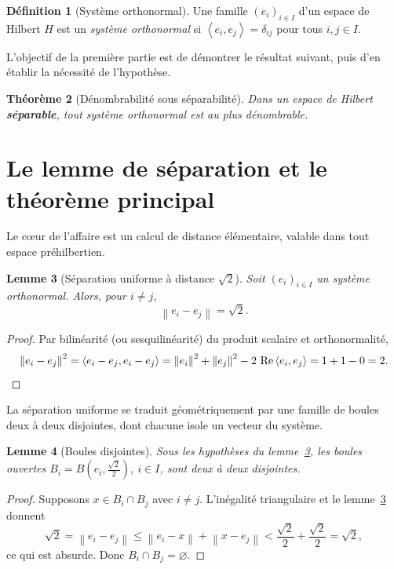 \documentclass[11pt,a4paper]{article}
\theoremstyle{plain}
\newtheorem{theoreme}{Théorème}[section]
\newtheorem{lemme}[theoreme]{Lemme}
\theoremstyle{definition}
\newtheorem{definition}[theoreme]{Définition}
\newcommand{\HH}{H}
\newcommand{\norm}[1]{\left\lVert #1 \right\rVert}
\newcommand{\scal}[2]{\left\langle #1 , #2 \right\rangle}
\renewcommand{\Re}{\operatorname{Re}}
\begin{document}
\begin{definition}[Système orthonormal]
Une famille $(e_i)_{i\in I}$ d'un espace de Hilbert $\HH$ est un \emph{système
orthonormal} si $\scal{e_i}{e_j} = \delta_{ij}$ pour tous $i,j \in I$.
\end{definition}

L'objectif de la première partie est de démontrer le résultat suivant, puis d'en
établir la nécessité de l'hypothèse.

\begin{theoreme}[Dénombrabilité sous séparabilité]\label{th:principal}
Dans un espace de Hilbert \textbf{séparable}, tout système orthonormal est
au plus dénombrable.
\end{theoreme}

\section{Le lemme de séparation et le théorème principal}

Le cœur de l'affaire est un calcul de distance élémentaire, valable dans tout
espace préhilbertien.

\begin{lemme}[Séparation uniforme à distance $\sqrt2$]\label{lem:sep}
Soit $(e_i)_{i\in I}$ un système orthonormal. Alors, pour $i \neq j$,
\[
  \norm{e_i - e_j} = \sqrt{2}.
\]
\end{lemme}

\begin{proof}
Par bilinéarité (ou sesquilinéarité) du produit scalaire et orthonormalité,
\[
  \norm{e_i - e_j}^2
   = \scal{e_i - e_j}{e_i - e_j}
   = \norm{e_i}^2 + \norm{e_j}^2 - 2\,\Re\scal{e_i}{e_j}
   = 1 + 1 - 0 = 2. \qedhere
\]
\end{proof}

La séparation uniforme se traduit géométriquement par une famille de boules deux
à deux disjointes, dont chacune isole un vecteur du système.

\begin{lemme}[Boules disjointes]\label{lem:boules}
Sous les hypothèses du lemme~\ref{lem:sep}, les boules ouvertes
$B_i = B\!\left(e_i, \tfrac{\sqrt2}{2}\right)$, $i \in I$, sont deux à deux
disjointes.
\end{lemme}

\begin{proof}
Supposons $x \in B_i \cap B_j$ avec $i \neq j$. L'inégalité triangulaire et le
lemme~\ref{lem:sep} donnent
\[
  \sqrt{2} = \norm{e_i - e_j}
   \le \norm{e_i - x} + \norm{x - e_j}
   < \frac{\sqrt2}{2} + \frac{\sqrt2}{2} = \sqrt2,
\]
ce qui est absurde. Donc $B_i \cap B_j = \varnothing$.
\end{proof}
\end{document}
